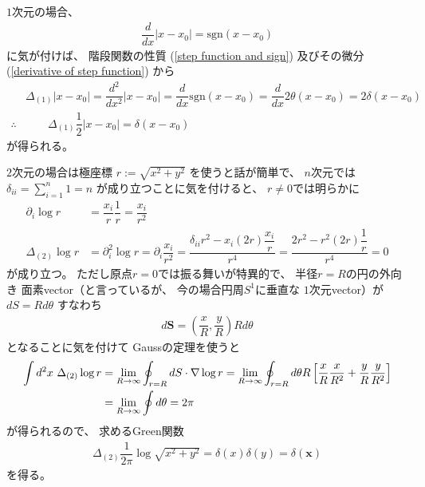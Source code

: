 $1$次元の場合、
\begin{align}
    \dfrac{d}{dx}
    |x - x_0|
=
    \mathrm{sgn}
    (x - x_0)
\end{align}
に気が付けば、
階段関数の性質
(\ref{step function and sign})
及びその微分
(\ref{derivative of step function})
から
\begin{subequations}
\begin{align}
    &
    \Delta_{(1)}
    |x - x_0|
=
    \dfrac{d^2}{dx^2}
    |x - x_0|
=
    \dfrac{d}{dx}
    \mathrm{sgn}
    (x - x_0)
=
    \dfrac{d}{dx}
    2 \theta (x - x_0)
=
    2 \delta (x - x_0)
\\\therefore
&\qquad
    \Delta_{(1)}
    \dfrac{1}{2}|x - x_0|
    =
    \delta (x - x_0)
\end{align}
\end{subequations}
が得られる。

$2$次元の場合は極座標
$r := \sqrt{x^2 + y^2}$
を使うと話が簡単で、
$n$次元では
$\displaystyle
\delta_{ii}
= \sum_{i=1}^n 1
= n$
が成り立つことに気を付けると、
$r \neq 0$では明らかに
\begin{subequations}
\begin{align}
    \partial_i
    \log r
&=
    \dfrac{x_i}{r}
    \dfrac{1}{r}
=
    \dfrac{x_i}{r^2}
\\
    \Delta_{(2)}
    \log r
&=
    \partial_i^2
    \log r
=
    \partial_i
    \dfrac{x_i}{r^2}
=
    \dfrac{
        \delta_{ii} r^2
    -
        x_i (2 r)
        \dfrac{x_i}{r}
    }{r^4}
=
    \dfrac{
        2 r^2
    -
        r^2 (2 r)
        \dfrac{1}{r}
    }{r^4}
= 0
\end{align}
\end{subequations}
が成り立つ。
ただし原点$r = 0$では振る舞いが特異的で、
半径$r = R$の円の外向き
面素vector（と言っているが、
今の場合円周$S^1$に垂直な
$1$次元vector）が
$dS = R d \theta$
すなわち
\begin{align}
    d \bm{S}
=
    \left(
        \dfrac{x}{R}
    ,
        \dfrac{y}{R}
    \right)
    R d \theta
\end{align}
となることに気を付けて
Gaussの定理を使うと
\begin{align}
    \int d^2 x\ 
        \Delta_{(2)}
        \log r
&=
    \lim_{R \to \infty}
    \oint_{r = R} d \bm{S}
        \cdot
        \nabla
        \log r
=
    \lim_{R \to \infty}
    \oint_{r = R}
        d \theta
    R
    \left[
        \dfrac{x}{R}
        \dfrac{x}{R^2}
    +
        \dfrac{y}{R}
        \dfrac{y}{R^2}
    \right]
\notag\\&
=
    \lim_{R \to \infty}
    \oint
        d \theta
=
    2 \pi
\end{align}
が得られるので、
求めるGreen関数
\begin{align}
    \Delta_{(2)}
    \dfrac{1}{2 \pi}
    \log \sqrt{x^2 + y^2}
=
    \delta(x)
    \delta(y)
=
    \delta(\bm{x})
\end{align}
を得る。

